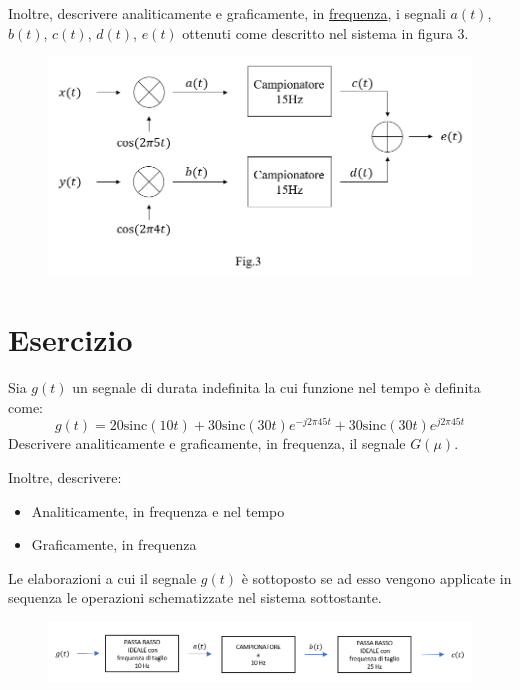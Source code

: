 \documentclass[a4paper]{article}
\begin{document}
	\noindent
	Inoltre, descrivere analiticamente e graficamente, in \underline{frequenza}, i segnali $a\left(t\right)$, $b\left(t\right)$, $c\left(t\right)$, $d\left(t\right)$, $e\left(t\right)$ ottenuti come descritto nel sistema in figura 3.
	\begin{figure}[!htp]
		\centering
		\includegraphics[width=\textwidth]{img/fig_2.png}
	\end{figure}

	\section{Esercizio}
	
	Sia $g\left(t\right)$ un segnale di durata indefinita la cui funzione nel tempo è definita come:
	\begin{equation*}
		g\left(t\right) = 20\mathrm{sinc}\left(10t\right) + 30\mathrm{sinc}\left(30t\right) e^{-j2\pi45t} + 30\mathrm{sinc}\left(30t\right) e^{j2\pi45t}
	\end{equation*}
	Descrivere analiticamente e graficamente, in frequenza, il segnale $G\left(\mu\right)$.\newline
	
	\noindent
	Inoltre, descrivere:
	\begin{itemize}
		\item Analiticamente, in frequenza e nel tempo
		\item Graficamente, in frequenza
	\end{itemize}
	Le elaborazioni a cui il segnale $g\left(t\right)$ è sottoposto se ad esso vengono applicate in sequenza le operazioni schematizzate nel sistema sottostante.
	\begin{figure}[!htp]
		\centering
		\includegraphics[width=\textwidth]{img/fig_3.png}
	\end{figure}\newpage
\end{document}
